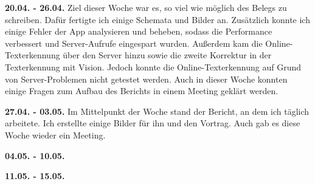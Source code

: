 \documentclass[notables, nomenclature, oneside, 150]{HSMW-Thesis}
\begin{document}
	\textbf{20.04. - 26.04.}
	Ziel dieser Woche war es, so viel wie möglich des Belegs zu schreiben. Dafür fertigte ich einige Schemata und Bilder an. Zusätzlich konnte ich einige Fehler der App analysieren und beheben, sodass die Performance verbessert und Server-Aufrufe eingespart wurden. Außerdem kam die Online-Texterkennung über den Server hinzu sowie die zweite Korrektur in der Texterkennung mit Vision. Jedoch konnte die Online-Texterkennung auf Grund von Server-Problemen nicht getestet werden. Auch in dieser Woche konnten einige Fragen zum Aufbau des Berichts in einem Meeting geklärt werden. 
	
	\textbf{27.04. - 03.05.}
	Im Mittelpunkt der Woche stand der Bericht, an dem ich täglich arbeitete. Ich erstellte einige Bilder für ihn und den Vortrag. Auch gab es diese Woche wieder ein Meeting.
	
	\textbf{04.05. - 10.05.}
	
	\textbf{11.05. - 15.05.}




\end{document}
